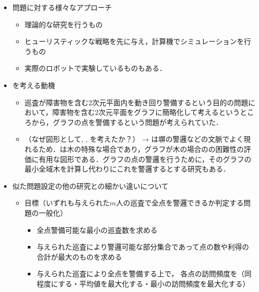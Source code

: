 \begin{itemize}
  \item 問題に対する様々なアプローチ
  \begin{itemize}
    \item 理論的な研究を行うもの\cite{}
    \item ヒューリスティックな戦略を先に与え，計算機でシミュレーションを行うもの\cite{}
    \item 実際のロボットで実験しているものもある\cite{}．
  \end{itemize}

  \item {\patProb}を考える動機
  \begin{itemize}
    \item 巡査が障害物を含む2次元平面内を動き回り警備するという目的の問題において，障害物を含む2次元平面をグラフに簡略化して考えるというところから，グラフの点を警備するという問題が考えられていた\cite{machado2002multi}．
    \item （なぜ図形として{\graphLine}, {\graphStar}, {\graphUnit}を考えたか？）
    → {\graphLine}は塀の警邏などの文脈でよく現れるため\cite{}．{\graphStar}は木の特殊な場合であり，グラフが木の場合の{\patProb}の困難性の評価に有用な図形である．グラフの点の警邏を行うために，そのグラフの最小全域木を計算し代わりにこれを警邏するとする研究もある\cite{}．
  \end{itemize}

  \item 似た問題設定の他の研究との細かい違いについて
  \begin{itemize}
    \item 目標（いずれも与えられた$m$人の巡査で全点を警邏できるか判定する問題の一般化）
    \begin{itemize}
      \item 全点警備可能な最小の巡査数を求める\cite{}
      \item 与えられた巡査により警邏可能な部分集合であって点の数や利得の合計が最大のものを求める\cite{}
      \item 与えられた巡査により全点を警備する上で，
      各点の訪問頻度を（同程度にする・平均値を最大化する・最小の訪問頻度を最大化する）\cite{}
    \end{itemize}
  \end{itemize}



\end{itemize}
